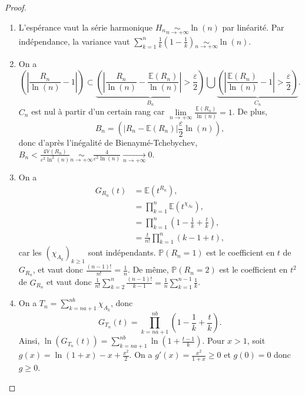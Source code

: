 \documentclass[12pt]{article}
\begin{document}
\begin{proof}
    \phantom{}
    \begin{enumerate}
        \item L'espérance vaut la série harmonique $H_n\underset{n\to+\infty}{\sim}\ln(n)$ par linéarité. Par indépendance, la variance vaut $\sum_{k=1}^{n}\frac{1}{k}\left(1-\frac{1}{k}\right)\underset{n\to+\infty}{\sim}\ln(n)$.
        \item On a 
        \begin{equation}
            \left(\left\lvert \frac{R_n}{\ln(n)}-1\right\rvert\right)\subset \underbrace{\left(\left\lvert \frac{R_n}{\ln(n)}-\frac{\mathbb{E}(R_n)}{\ln(n)}\right\rvert>\frac{\varepsilon}{2}\right)}_{B_n}\bigcup\underbrace{\left(\left\lvert\frac{\mathbb{E}(R_n)}{\ln(n)}-1\right\rvert>\frac{\varepsilon}{2}\right)}_{C_n}.
        \end{equation}
        $C_n$ est nul à partir d'un certain rang car $\lim\limits_{n\to+\infty}\frac{\mathbb{E}(R_n)}{\ln(n)}=1$. De plus, 
        \begin{equation}
            B_n=\left(\left\lvert R_n-\mathbb{E}(R_n)\right\rvert\frac{\varepsilon}{2}\ln(n)\right),    
        \end{equation}
        donc d'après l'inégalité de Bienaymé-Tchebychev, $B_n<\frac{4\mathbb{V}(R_n)}{\varepsilon^{2}\ln^{2}(n)}\underset{n\to+\infty}{\sim}\frac{4}{\varepsilon^{2}\ln(n)}\xrightarrow[n\to+\infty]{}0$.

        \item On a 
        \begin{align}
            G_{R_n}(t)
            &=\mathbb{E}\left(t^{R_n}\right),\\
            &=\prod_{k=1}^{n}\mathbb{E}(t^{\chi_{A_k}}),\\
            &=\prod_{k=1}^{n}\left(1-\frac{1}{k}+\frac{t}{k}\right),\\
            &=\frac{t}{n!}\prod_{k=1}^{n}\left(k-1+t\right),
        \end{align}
        car les $(\chi_{A_k})_{k\geqslant1}$ sont indépendants. $\mathbb{P}(R_n=1)$ est le coefficient en $t$ de $G_{R_n}$, et vaut donc $\frac{(n-1)!}{n!}=\frac{1}{n}$. De même, $\mathbb{P}(R_n=2)$ est le coefficient en $t^{2}$ de $G_{R_n}$ et vaut donc $\frac{1}{n!}\sum_{k=2}^{n}\frac{(n-1)!}{k-1}=\frac{1}{n}\sum_{k=1}^{n-1}\frac{1}{k}$.

        \item On a $T_n=\sum_{k=na+1}^{nb}\chi_{A_k}$, donc 
        \begin{equation}
            G_{T_n}(t)=\prod_{k=na+1}^{nb}\left(1-\frac{1}{k}+\frac{t}{k}\right).
        \end{equation}
        Ainsi, $\ln\left(G_{T_n}(t)\right)=\sum_{k=na+1}^{nb}\ln\left(1+\frac{t-1}{k}\right)$. Pour $x>1$, soit $g(x)=\ln(1+x)-x+\frac{x^{2}}{2}$. On a $g'(x)=\frac{x^{2}}{1+x}\geqslant0$ et $g(0)=0$ donc $g\geqslant0$.


\end{enumerate}
\end{proof}
\end{document}
